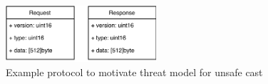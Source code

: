 \begin{figure}[htp!]
    \centering
    \includegraphics[width=0.5\textwidth]{assets/figures/chapter3/protocol.pdf}
    \caption{Example protocol to motivate threat model for unsafe cast}
    \label{fig:protocol-threat-model}
\end{figure}
